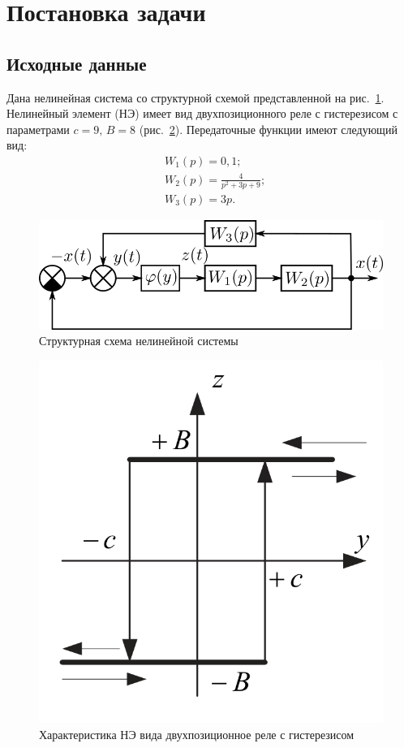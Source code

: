 


	
	
	\setcounter{page}{2}
	\tableofcontents
	\newpage
	
	\section{Постановка задачи}
	\subsection{Исходные данные}
	
	Дана нелинейная система со структурной схемой представленной на рис.~\ref{scheme}. Нелинейный элемент (НЭ) имеет вид двухпозиционного реле с гистерезисом с параметрами $c = 9,\,B=8$ (рис.~\ref{NE}). Передаточные функции имеют следующий вид:
	\begin{align*}
		&W_1(p) = 0,1; \\
		&W_2(p) = \frac{4}{p^2 + 3p + 9}; \\ 
		&W_3(p) = 3p.
	\end{align*}
	
	\begin{figure}[h]
		\centering\includegraphics[width=.8\textwidth]{схема.png}
		\caption{Структурная схема нелинейной системы}
		\label{scheme}
	\end{figure}
	\begin{figure}[h]
		\centering\includegraphics[width=.4\textwidth]{НЭ.png}
		\caption{Характеристика НЭ вида двухпозиционное реле с гистерезисом}
		\label{NE}
	\end{figure}
	
